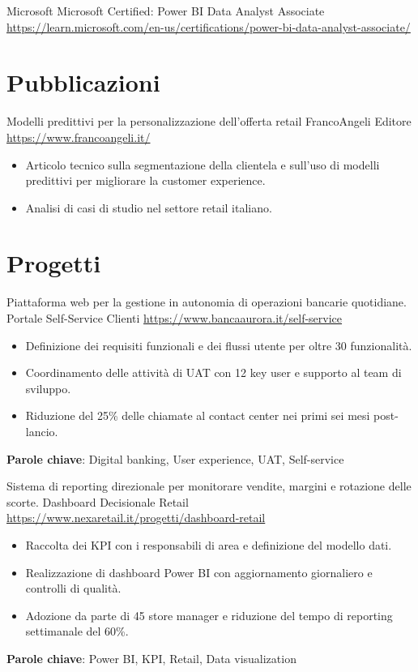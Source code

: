 \documentclass[a4paper, serif, 10pt]{moderncv}
\begin{document}
        {Microsoft}
        {Microsoft Certified: Power BI Data Analyst Associate}
        {\url{https://learn.microsoft.com/en-us/certifications/power-bi-data-analyst-associate/}}
        {}
        {}
\section{Pubblicazioni}

        {Modelli predittivi per la personalizzazione dell'offerta retail}
        {FrancoAngeli Editore}
        {\url{https://www.francoangeli.it/}}
        {}
        {\begin{itemize}
\item Articolo tecnico sulla segmentazione della clientela e sull'uso di modelli predittivi per migliorare la customer experience.
\item Analisi di casi di studio nel settore retail italiano.
\end{itemize}}
\section{Progetti}

        {Piattaforma web per la gestione in autonomia di operazioni bancarie quotidiane.}
        {Portale Self-Service Clienti}
        {\url{https://www.bancaaurora.it/self-service}}
        {}
        {\begin{itemize}
\item Definizione dei requisiti funzionali e dei flussi utente per oltre 30 funzionalità.
\item Coordinamento delle attività di UAT con 12 key user e supporto al team di sviluppo.
\item Riduzione del 25\% delle chiamate al contact center nei primi sei mesi post-lancio.
\end{itemize}
\textbf{Parole chiave}: Digital banking, User experience, UAT, Self-service}

        {Sistema di reporting direzionale per monitorare vendite, margini e rotazione delle scorte.}
        {Dashboard Decisionale Retail}
        {\url{https://www.nexaretail.it/progetti/dashboard-retail}}
        {}
        {\begin{itemize}
\item Raccolta dei KPI con i responsabili di area e definizione del modello dati.
\item Realizzazione di dashboard Power BI con aggiornamento giornaliero e controlli di qualità.
\item Adozione da parte di 45 store manager e riduzione del tempo di reporting settimanale del 60\%.
\end{itemize}
\textbf{Parole chiave}: Power BI, KPI, Retail, Data visualization}
\end{document}
